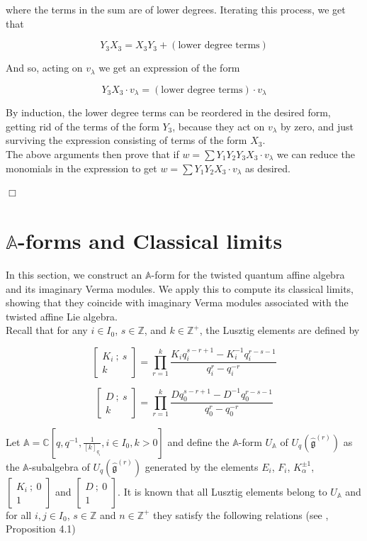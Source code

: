 \documentclass[12pt]{amsart}
\numberwithin{equation}{section}
\newcommand{\findem }{\hfill $\Box$ \vskip0.5cm }
\newcommand{\Z}{\ensuremath{\mathbb{Z}}}
\newcommand{\C}{\ensuremath{\mathbb{C}}}
\newcommand{\A}{\ensuremath{\mathbb{A}}}
\newcommand{\g}{\ensuremath{\mathfrak{g}}}
\begin{document}
where the terms in the sum are of lower degrees. Iterating this process, we get that 

$$ Y_3X_3 = X_3Y_3 + (\mbox{lower degree terms}) $$

And so, acting on $v_\lambda$ we get an expression of the form 

$$ Y_3X_3\cdot v_\lambda = (\mbox{lower degree terms})\cdot v_\lambda $$

By induction, the lower degree terms can be reordered in the desired form, getting rid of the terms of the form $Y_3$, because they act on $v_\lambda$ by zero, and just surviving the expression consisting of terms of the form $X_3$.\\

The above arguments then prove that if  $w = \sum Y_1Y_2Y_3X_3 \cdot v_\lambda$ we can reduce the monomials in the expression to get $w = \sum Y_1Y_2X_3 \cdot v_\lambda$ as desired.

\findem

\section{$\mathbb{A}$-forms and Classical limits}

In this section, we construct an $\mathbb{A}$-form for the twisted quantum affine algebra and its imaginary Verma modules. We apply this to compute its classical limits, showing that they coincide with imaginary Verma modules associated with the twisted affine Lie algebra.\\ 

Recall that for any $i\in I_0$, $s\in \Z$, and $k\in \Z^{+}$, the Lusztig elements are defined by 

$$ \begin{bmatrix} K_i \ ;\  s \\ k \end{bmatrix}  = \prod_{r=1}^k \frac{K_iq_i^{s-r+1} - K_i^{-1}q_i^{r-s-1}}{q_i^{r} - q_i^{-r}}$$

$$ \begin{bmatrix} D \ ;\  s \\ k \end{bmatrix}  = \prod_{r=1}^k \frac{Dq_0^{s-r+1} - D^{-1}q_0^{r-s-1}}{q_0^{r} - q_0^{-r}}$$

Let $\mathbb{A} = \C[q, q^{-1}, \frac{1}{[k]_{q_i}}, i \in I_0, k>0]$ and define the $\A$-form $U_{\A}$ of $U_q(\hat{\g}^{(r)})$ as the $\A$-subalgebra of $U_q(\hat{\g}^{(r)})$ generated by the elements $E_i$, $F_i$, $K_\alpha^{\pm 1}$, $\begin{bmatrix} K_i \ ;\  0 \\ 1 \end{bmatrix}$ and $\begin{bmatrix} D \ ;\  0 \\ 1 \end{bmatrix}$. It is known that all Lusztig elements belong to $U_{\A}$ and for all $i,j \in I_0$, $s\in \Z$ and $n\in \Z^{+}$ they satisfy the following relations (see \cite{FGM}, Proposition 4.1)
\end{document}
